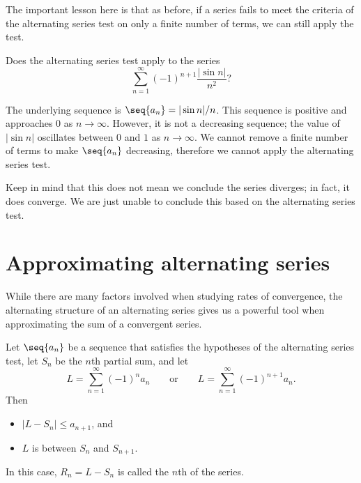 \documentclass{ximera}
\begin{document}
\begin{question}
\begin{question}
\begin{prompt}
\begin{feedback}
        The important lesson here is that as before, if a series fails
        to meet the criteria of the alternating series test on only a
        finite number of terms, we can still apply the test.
      \end{feedback}
    \end{prompt}
    \begin{question}
      Does the alternating series test apply to the series
      \[
      \sum_{n=1}^\infty (-1)^{n+1}\frac{|\sin n|}{n^2}?
      \]
      \begin{prompt}
        \begin{multipleChoice}
        \end{multipleChoice}
        \begin{feedback}
          The underlying sequence is $\seq{a_n} = |\sin n|/n$. This
          sequence is positive and approaches $0$ as
          $n\to\infty$. However, it is not a decreasing sequence; the
          value of $|\sin n|$ oscillates between $0$ and $1$ as
          $n\to\infty$. We cannot remove a finite number of terms to
          make $\seq{a_n}$ decreasing, therefore we cannot apply the
          alternating series test.
	  
          Keep in mind that this does not mean we conclude the series
          diverges; in fact, it does converge. We are just unable to
          conclude this based on the alternating series test.
        \end{feedback}
      \end{prompt}
    \end{question}
  \end{question}
\end{question}




\section{Approximating alternating series}


While there are many factors involved when studying rates of
convergence, the alternating structure of an alternating series gives
us a powerful tool when approximating the sum of a convergent series.

\begin{theorem}
Let $\seq{a_n}$ be a sequence that satisfies the hypotheses of the
alternating series test, let $S_n$ be the $n$th partial
sum, and let
\[
L = \sum_{n=1}^\infty (-1)^{n}a_n\qquad\text{or}\qquad L=\sum_{n=1}^\infty (-1)^{n+1}a_n.
\]
Then
\begin{itemize}
\item $|L-S_n| \leq a_{n+1}$, and
\item $L$ is between $S_n$ and $S_{n+1}$.
\end{itemize}
In this case, $R_n=L-S_n$ is called the $n$th  of the
series.
\end{theorem}
\end{document}
